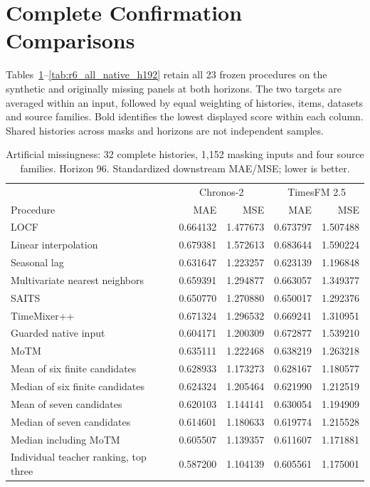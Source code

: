 \section{Complete Confirmation Comparisons}
\label{app:r6_full}
Tables~\ref{tab:r6_all_synthetic_h96}--\ref{tab:r6_all_native_h192} retain all 23 frozen procedures on the synthetic and originally missing panels at both horizons. The two targets are averaged within an input, followed by equal weighting of histories, items, datasets and source families. Bold identifies the lowest displayed score within each column. Shared histories across masks and horizons are not independent samples.
\begin{table}[!htbp]
\caption{Artificial missingness: 32 complete histories, 1,152 masking inputs and four source families. Horizon 96. Standardized downstream MAE/MSE; lower is better.}
\label{tab:r6_all_synthetic_h96}
\centering\small
\begin{tabular}{lrrrr}
\toprule
 & \multicolumn{2}{c}{Chronos-2} & \multicolumn{2}{c}{TimesFM 2.5}\\
Procedure & MAE & MSE & MAE & MSE\\
\midrule
LOCF & 0.664132 & 1.477673 & 0.673797 & 1.507488\\
Linear interpolation & 0.679381 & 1.572613 & 0.683644 & 1.590224\\
Seasonal lag & 0.631647 & 1.223257 & 0.623139 & 1.196848\\
Multivariate nearest neighbors & 0.659391 & 1.294877 & 0.663057 & 1.349377\\
SAITS & 0.650770 & 1.270880 & 0.650017 & 1.292376\\
TimeMixer++ & 0.671324 & 1.296532 & 0.669241 & 1.310951\\
Guarded native input & 0.604171 & 1.200309 & 0.672877 & 1.539210\\
MoTM & 0.635111 & 1.222468 & 0.638219 & 1.263218\\
Mean of six finite candidates & 0.628933 & 1.173273 & 0.628167 & 1.180577\\
Median of six finite candidates & 0.624324 & 1.205464 & 0.621990 & 1.212519\\
Mean of seven candidates & 0.620103 & 1.144141 & 0.630054 & 1.194909\\
Median of seven candidates & 0.614601 & 1.180633 & 0.619774 & 1.215528\\
Median including MoTM & 0.605507 & 1.139357 & 0.611607 & 1.171881\\
Individual teacher ranking, top three & 0.587200 & 1.104139 & 0.605561 & 1.175001\\

\end{tabular}
\end{table}
